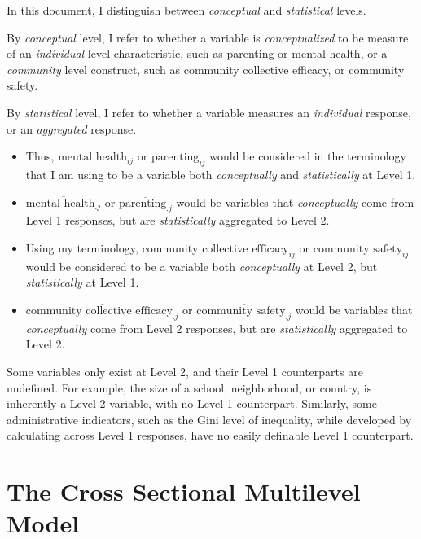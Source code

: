 \documentclass[
  letterpaper,
  DIV=11,
  numbers=noendperiod]{scrreprt}
\begin{document}
In this document, I distinguish between \emph{conceptual} and
\emph{statistical} levels.

By \emph{conceptual} level, I refer to whether a variable is
\emph{conceptualized} to be measure of an \emph{individual} level
characteristic, such as parenting or mental health, or a
\emph{community} level construct, such as community collective efficacy,
or community safety.

By \emph{statistical} level, I refer to whether a variable measures an
\emph{individual} response, or an \emph{aggregated} response.

\begin{itemize}
\item
  Thus, \(\text{mental health}_{ij}\) or \(\text{parenting}_{ij}\) would
  be considered in the terminology that I am using to be a variable both
  \emph{conceptually} and \emph{statistically} at Level 1.
\item
  \(\overline{\text{mental health}_{.j}}\) or
  \(\overline{\text{parenting}_{.j}}\) would be variables that
  \emph{conceptually} come from Level 1 responses, but are
  \emph{statistically} aggregated to Level 2.
\item
  Using my terminology, \(\text{community collective efficacy}_{ij}\) or
  \(\text{community safety}_{ij}\) would be considered to be a variable
  both \emph{conceptually} at Level 2, but \emph{statistically} at Level
  1.
\item
  \(\overline{\text{community collective efficacy}_{.j}}\) or
  \(\overline{\text{community safety}_{.j}}\) would be variables that
  \emph{conceptually} come from Level 2 responses, but are
  \emph{statistically} aggregated to Level 2.
\end{itemize}

Some variables only exist at Level 2, and their Level 1 counterparts are
undefined. For example, the size of a school, neighborhood, or country,
is inherently a Level 2 variable, with no Level 1 counterpart.
Similarly, some administrative indicators, such as the Gini level of
inequality, while developed by calculating across Level 1 responses,
have no easily definable Level 1 counterpart.


\hypertarget{the-cross-sectional-multilevel-model}{%
\chapter{The Cross Sectional Multilevel
Model}\label{the-cross-sectional-multilevel-model}}
\end{document}

